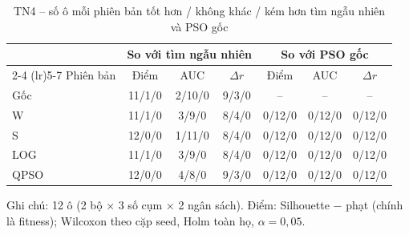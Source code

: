 \begin{table}[htbp]
\centering
\caption{TN4 -- số ô mỗi phiên bản tốt hơn / không khác / kém hơn tìm ngẫu nhiên và PSO gốc}
\label{tab:e9-tong-hop}
\footnotesize
\setlength{\tabcolsep}{3pt}
\begin{tabular}{@{}lcccccc@{}}
\toprule
& \multicolumn{3}{c}{So với tìm ngẫu nhiên} & \multicolumn{3}{c}{So với PSO gốc} \\
\cmidrule(lr){2-4} \cmidrule(lr){5-7}
Phiên bản & Điểm & AUC & $\Delta r$ & Điểm & AUC & $\Delta r$ \\
\midrule
Gốc & 11/1/0 & 2/10/0 & 9/3/0 & -- & -- & -- \\
W & 11/1/0 & 3/9/0 & 8/4/0 & 0/12/0 & 0/12/0 & 0/12/0 \\
S & 12/0/0 & 1/11/0 & 8/4/0 & 0/12/0 & 0/12/0 & 0/12/0 \\
LOG & 11/1/0 & 3/9/0 & 8/4/0 & 0/12/0 & 0/12/0 & 0/12/0 \\
QPSO & 12/0/0 & 4/8/0 & 9/3/0 & 0/12/0 & 0/12/0 & 0/12/0 \\
\bottomrule
\end{tabular}
\par\smallskip\parbox{\linewidth}{\scriptsize Ghi chú: 12 ô (2 bộ × 3 số cụm × 2 ngân sách). Điểm: Silhouette − phạt (chính là fitness); Wilcoxon theo cặp seed, Holm toàn họ, $\alpha = 0{,}05$.}
\end{table}
